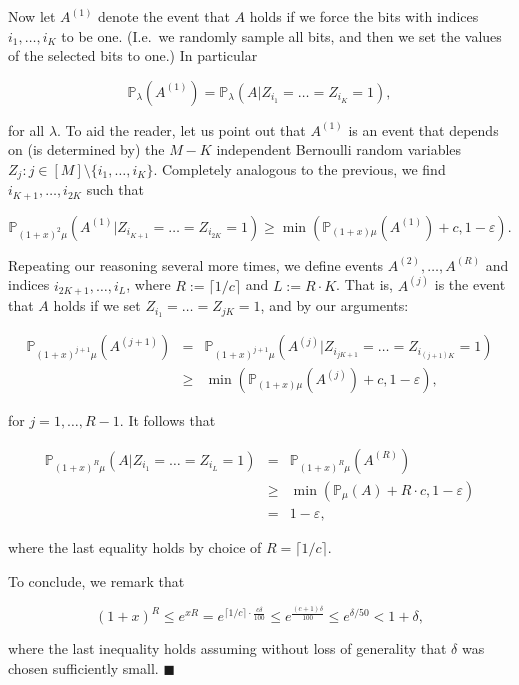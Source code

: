 \documentclass[11pt]{article}%
\newenvironment{proof}{\vspace{1ex}\noindent{\bf Proof.}}{\hspace*{\fill}$\blacksquare$\vspace{1ex}}
\newcommand{\Pee}[0]{\ensuremath{{\mathbb P}}}
\newcommand{\eps}{\varepsilon}
\begin{document}
\begin{proof}
Now let $A^{(1)}$ denote the event that $A$ holds if we force the bits with indices $i_1,\dots,i_K$ 
to be one. (I.e.~we randomly sample all bits, and then we set the values of the
selected bits to one.) 
In particular 

$$ \Pee_\lambda(A^{(1)}) = \Pee_\lambda(A|Z_{i_1}=\dots=Z_{i_K}=1), $$

\noindent
for all $\lambda$. To aid the reader, let us point out that $A^{(1)}$ is an event that depends on (is determined by)
the $M-K$ independent Bernoulli 
random variables $Z_j : j \in [M] \setminus \{i_1,\dots,i_K\}$. 
Completely analogous to the previous, we find $i_{K+1},\dots,i_{2K}$ such that

$$ \Pee_{(1+x)^2\mu}(A^{(1)}|Z_{i_{K+1}}=\dots=Z_{i_{2K}}=1 ) \geq \min\left( \Pee_{(1+x)\mu}(A^{(1)})+c, 1-\eps \right). $$

Repeating our reasoning several more times, we define events $A^{(2)}, \dots, A^{(R)}$
and indices $i_{2K+1}, \dots, i_{L}$, where $R := \lceil 1/c\rceil$ and $L := R \cdot K$.
That is, $A^{(j)}$ is the event that $A$ holds if we set $Z_{i_1}=\dots=Z_{jK}=1$, and
by our arguments:

$$ \begin{array}{rcl} \Pee_{(1+x)^{j+1}\mu}(A^{(j+1)}) 
& = & \Pee_{(1+x)^{j+1}\mu}(A^{(j)}|Z_{i_{jK+1}}=\dots=Z_{i_{(j+1)K}}=1 ) \\
& \geq & \min\left( \Pee_{(1+x)\mu}(A^{(j)})+c, 1-\eps \right), 
\end{array} $$

\noindent 
for $j=1,\dots,R-1$.
It follows that 

$$ \begin{array}{rcl} 
\Pee_{(1+x)^R\mu}( A | Z_{i_1}=\dots=Z_{i_L}=1 )
& = & \Pee_{(1+x)^R\mu}( A^{(R)} ) \\
& \geq & \min\left( \Pee_\mu(A) + R\cdot c, 1-\eps\right) \\
& = & 1-\eps, 
\end{array} $$

\noindent
where the last equality holds by choice of $R = \lceil 1/c\rceil$.

To conclude, we remark that 

$$ (1+x)^R \leq e^{xR} = e^{\lceil 1/c\rceil \cdot \frac{c\delta}{100}}
\leq e^{\frac{(c+1)\delta}{100}}
\leq e^{\delta/50} < 1+\delta, $$

\noindent
where the last inequality holds assuming without loss of generality that $\delta$ was chosen 
sufficiently small.
\end{proof}
\end{document}
